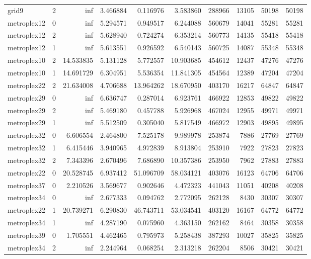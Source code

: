 \begin{longtable}{|l|r|r|r|r|r|r|r|r|r|}
grid9 & 2 & inf & 3.466884 & 0.116976 & 3.583860 & 288966 & 13105 & 50198 & 50198 \\
metroplex12 & 0 & inf & 5.294571 & 0.949517 & 6.244088 & 560679 & 14041 & 55281 & 55281 \\
metroplex12 & 2 & inf & 5.628940 & 0.724274 & 6.353214 & 560773 & 14135 & 55418 & 55418 \\
metroplex12 & 1 & inf & 5.613551 & 0.926592 & 6.540143 & 560725 & 14087 & 55348 & 55348 \\
metroplex10 & 2 & 14.533835 & 5.131128 & 5.772557 & 10.903685 & 454612 & 12437 & 47276 & 47276 \\
metroplex10 & 1 & 14.691729 & 6.304951 & 5.536354 & 11.841305 & 454564 & 12389 & 47204 & 47204 \\
metroplex22 & 2 & 21.634008 & 4.706688 & 13.964262 & 18.670950 & 403170 & 16217 & 64847 & 64847 \\
metroplex29 & 0 & inf & 6.636747 & 0.287014 & 6.923761 & 466922 & 12853 & 49822 & 49822 \\
metroplex29 & 2 & inf & 5.469180 & 0.457788 & 5.926968 & 467024 & 12955 & 49971 & 49971 \\
metroplex29 & 1 & inf & 5.512509 & 0.305040 & 5.817549 & 466972 & 12903 & 49895 & 49895 \\
metroplex32 & 0 & 6.606554 & 2.464800 & 7.525178 & 9.989978 & 253874 & 7886 & 27769 & 27769 \\
metroplex32 & 1 & 6.415446 & 3.940965 & 4.972839 & 8.913804 & 253910 & 7922 & 27823 & 27823 \\
metroplex32 & 2 & 7.343396 & 2.670496 & 7.686890 & 10.357386 & 253950 & 7962 & 27883 & 27883 \\
metroplex22 & 0 & 20.528745 & 6.937412 & 51.096709 & 58.034121 & 403076 & 16123 & 64706 & 64706 \\
metroplex37 & 0 & 2.210526 & 3.569677 & 0.902646 & 4.472323 & 441043 & 11051 & 40208 & 40208 \\
metroplex34 & 0 & inf & 2.677333 & 0.094762 & 2.772095 & 262128 & 8430 & 30307 & 30307 \\
metroplex22 & 1 & 20.739271 & 6.290830 & 46.743711 & 53.034541 & 403120 & 16167 & 64772 & 64772 \\
metroplex34 & 1 & inf & 4.287190 & 0.075960 & 4.363150 & 262162 & 8464 & 30358 & 30358 \\
metroplex39 & 0 & 1.705551 & 4.462465 & 0.795973 & 5.258438 & 387293 & 10027 & 35825 & 35825 \\
metroplex34 & 2 & inf & 2.244964 & 0.068254 & 2.313218 & 262204 & 8506 & 30421 & 30421 \\

\end{longtable}
